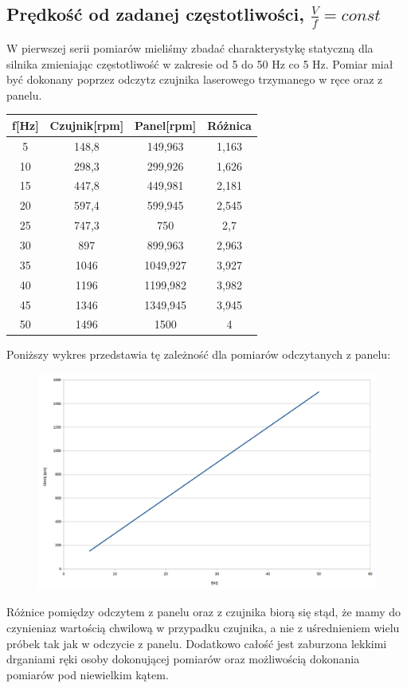 \documentclass[a4paper, 12pt]{article}
\begin{document}
		\subsection{Prędkość od zadanej częstotliwości, $\frac{V}{f} = const$}
			W pierwszej serii pomiarów mieliśmy zbadać charakterystykę statyczną dla silnika zmieniając częstotliwość w zakresie od 5 do 50 Hz co 5 Hz. Pomiar miał być dokonany poprzez odczyt\linebreak z czujnika laserowego trzymanego w ręce oraz z panelu.
			\begin{center}
				\begin{tabular}{|c|c|c|c|}
					\hline f[Hz] & Czujnik[rpm] & Panel[rpm] & Różnica \\ 
					\hline 5 & 148,8 & 149,963 & 1,163 \\ 
					\hline 10 & 298,3 & 299,926 & 1,626 \\ 
					\hline 15 & 447,8 & 449,981 & 2,181 \\ 
					\hline 20 & 597,4 & 599,945 & 2,545 \\ 
					\hline 25 & 747,3 & 750 & 2,7\\ 
					\hline 30 & 897 & 899,963 & 2,963 \\ 
					\hline 35 & 1046 & 1049,927 & 3,927 \\ 
					\hline 40 & 1196 & 1199,982 & 3,982\\ 
					\hline 45 & 1346 & 1349,945 & 3,945\\ 
					\hline 50 & 1496 & 1500 & 4\\ 
					\hline 
				\end{tabular}
			\end{center}
			Poniższy wykres przedstawia tę zależność dla pomiarów odczytanych z panelu:
			\begin{figure}[H]
				\centering
				\includegraphics[width=\textwidth]{./img/pierwsze.png}
			\end{figure}
			\noindent Różnice pomiędzy odczytem z panelu oraz z czujnika biorą się stąd, że mamy do czynienia\linebreak z wartością chwilową w przypadku czujnika, a nie z uśrednieniem wielu próbek tak jak w odczycie z panelu. Dodatkowo całość jest zaburzona lekkimi drganiami ręki osoby dokonującej pomiarów oraz możliwością dokonania pomiarów pod niewielkim kątem.
\end{document}
